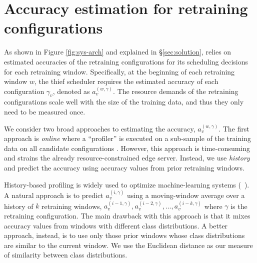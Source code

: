 \section{Accuracy estimation for retraining configurations}
\label{sec:profiling}

As shown in Figure \ref{fig:sys-arch} and explained in \S\ref{sec:solution}, {\name} relies on estimated accuracies of the retraining configurations for its scheduling decisions for each retraining window. Specifically, at the beginning of each retraining window $w$, the thief scheduler requires the estimated accuracy of each configuration $\gamma_v$, denoted as $a_v^{(w,\gamma)}$. The resource demands of the retraining configurations scale well with the size of the training data, and thus they only need to be measured once.

We consider two broad approaches to estimating the accuracy, $a_v^{(w,\gamma)}$. The first approach is {\em online} where a ``profiler'' is executed on a sub-sample of the training data on all candidate configurations \cite{videostorm}. However, this approach is time-consuming and strains the already resource-constrained edge server. Instead, we use {\em history} and predict the accuracy using accuracy values from prior retraining windows.

History-based profiling is widely used to optimize machine-learning systems (\eg~\cite{awstream,chameleon}). 
A natural approach is to predict $a_v^{(i,\gamma)}$ using a moving-window average over a history of $k$ retraining windows, $a_v^{(i-1,\gamma)},a_v^{(i-2,\gamma)},\dots,a_v^{(i-k,\gamma)}$ where $\gamma$ is the retraining configuration. The main drawback with this approach is that it mixes accuracy values from windows with different class distributions. A better approach, instead, is to use only those prior windows whose class distributions are similar to the current window. We use the Euclidean distance as our measure of similarity between class distributions. %




